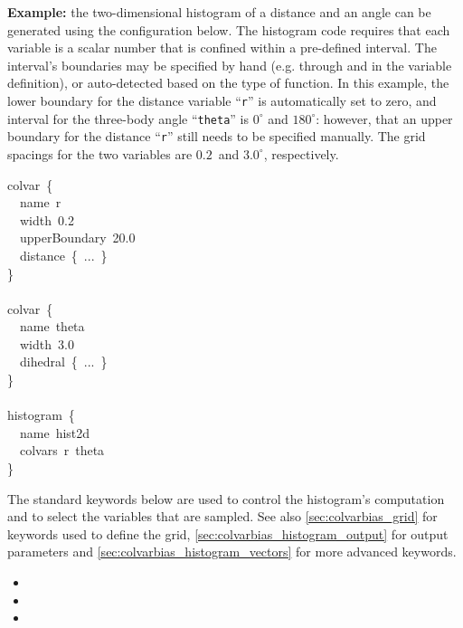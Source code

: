 \noindent\textbf{Example:} the two-dimensional histogram of a distance and an angle can be generated using the configuration below.  The histogram code requires that each variable is a scalar number that is confined within a pre-defined interval.  The interval's boundaries may be specified by hand (e.g.{} through  and  in the variable definition), or auto-detected based on the type of function.  In this example, the lower boundary for the distance variable ``\texttt{r}'' is automatically set to zero, and interval for the three-body angle ``\texttt{theta}'' is $0^\circ$ and $180^\circ$: however, that an upper boundary for the distance ``\texttt{r}'' still needs to be specified manually.  The grid spacings for the two variables are $0.2$~\lengthunit and $3.0^\circ$, respectively.
\begin{cvexampleinput}
\-colvar~\{\\
\-\-~~name~r\\
\-\-~~width~0.2\\
\-\-~~upperBoundary~20.0\\
\-\-~~distance~\{~...~\}\\
\-\}\\
\\
\-colvar~\{\\
\-\-~~name~theta\\
\-\-~~width~3.0\\
\-\-~~dihedral~\{~...~\}\\
\-\}\\
\\
\-histogram~\{\\
\-\-~~name~hist2d\\
\-\-~~colvars~r~theta\\
\-\}\\
\end{cvexampleinput}


The standard keywords below are used to control the histogram's computation and to select the variables that are sampled.  See also \ref{sec:colvarbias_grid} for keywords used to define the grid, \ref{sec:colvarbias_histogram_output} for output parameters and \ref{sec:colvarbias_histogram_vectors} for more advanced keywords.

\begin{itemize}

\item {}
\item {}
\item {}

\end{itemize}


